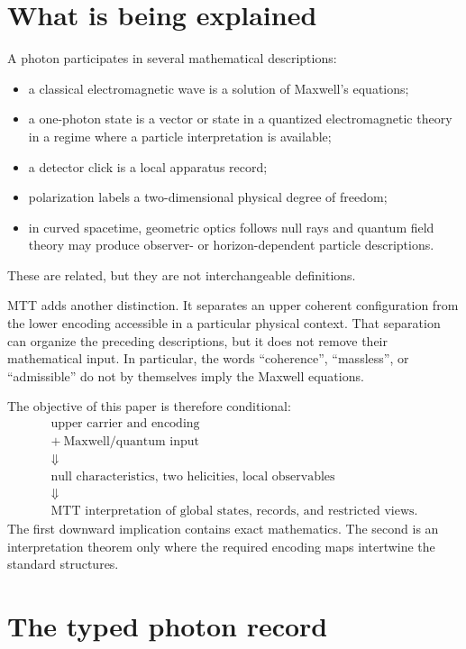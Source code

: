 \documentclass[11pt,a4paper]{article}
\numberwithin{equation}{section}
\theoremstyle{definition}
\theoremstyle{remark}
\begin{document}
\section{What is being explained}

A photon participates in several mathematical descriptions:
\begin{itemize}
\item a classical electromagnetic wave is a solution of Maxwell's
equations;
\item a one-photon state is a vector or state in a quantized
electromagnetic theory in a regime where a particle interpretation is
available;
\item a detector click is a local apparatus record;
\item polarization labels a two-dimensional physical degree of freedom;
\item in curved spacetime, geometric optics follows null rays and quantum
field theory may produce observer- or horizon-dependent particle
descriptions.
\end{itemize}
These are related, but they are not interchangeable definitions.

MTT adds another distinction.  It separates an upper coherent
configuration from the lower encoding accessible in a particular
physical context.  That separation can organize the preceding
descriptions, but it does not remove their mathematical input.  In
particular, the words ``coherence'', ``massless'', or ``admissible'' do
not by themselves imply the Maxwell equations.

The objective of this paper is therefore conditional:
\[
\boxed{
\begin{gathered}
\text{upper carrier and encoding}\\
+\ \text{Maxwell/quantum input}\\
\Downarrow\\
\text{null characteristics, two helicities, local observables}\\
\Downarrow\\
\text{MTT interpretation of global states, records, and restricted views}.
\end{gathered}}
\]
The first downward implication contains exact mathematics.  The second is
an interpretation theorem only where the required encoding maps
intertwine the standard structures.

\section{The typed photon record}
\end{document}
